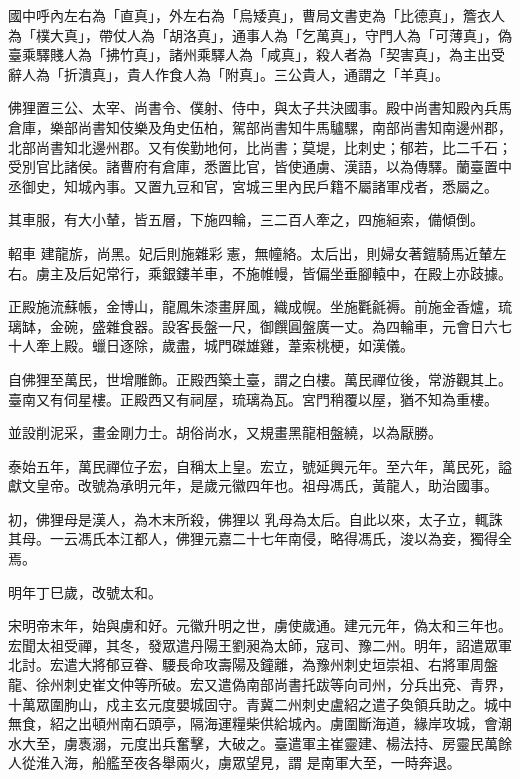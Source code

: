 \begin{pinyinscope}
 國中呼內左右為「直真」，外左右為「烏矮真」，曹局文書吏為「比德真」，簷衣人為「樸大真」，帶仗人為「胡洛真」，通事人為「乞萬真」，守門人為「可薄真」，偽臺乘驛賤人為「拂竹真」，諸州乘驛人為「咸真」，殺人者為「契害真」，為主出受辭人為「折潰真」，貴人作食人為「附真」。三公貴人，通謂之「羊真」。



 佛狸置三公、太宰、尚書令、僕射、侍中，與太子共決國事。殿中尚書知殿內兵馬倉庫，樂部尚書知伎樂及角史伍柏，駕部尚書知牛馬驢騾，南部尚書知南邊州郡，北部尚書知北邊州郡。又有俟勤地何，比尚書；莫堤，比刺史；郁若，比二千石；受別官比諸侯。諸曹府有倉庫，悉置比官，皆使通虜、漢語，以為傳驛。蘭臺置中丞御史，知城內事。又置九豆和官，宮城三里內民戶籍不屬諸軍戍者，悉屬之。



 其車服，有大小輦，皆五層，下施四輪，三二百人牽之，四施絙索，備傾倒。



 軺車
 建龍旂，尚黑。妃后則施雜彩憲，無幢絡。太后出，則婦女著鎧騎馬近輦左右。虜主及后妃常行，乘銀鏤羊車，不施帷幔，皆偏坐垂腳轅中，在殿上亦跂據。



 正殿施流蘇帳，金博山，龍鳳朱漆畫屏風，織成幌。坐施氍毹褥。前施金香爐，琉璃缽，金碗，盛雜食器。設客長盤一尺，御饌圓盤廣一丈。為四輪車，元會日六七十人牽上殿。蠟日逐除，歲盡，城門磔雄雞，葦索桃梗，如漢儀。



 自佛狸至萬民，世增雕飾。正殿西築土臺，謂之白樓。萬民禪位後，常游觀其上。臺南又有伺星樓。正殿西又有祠屋，琉璃為瓦。宮門稍覆以屋，猶不知為重樓。



 並設削泥采，畫金剛力士。胡俗尚水，又規畫黑龍相盤繞，以為厭勝。



 泰始五年，萬民禪位子宏，自稱太上皇。宏立，號延興元年。至六年，萬民死，謚獻文皇帝。改號為承明元年，是歲元徽四年也。祖母馮氏，黃龍人，助治國事。



 初，佛狸母是漢人，為木末所殺，佛狸以
 乳母為太后。自此以來，太子立，輒誅其母。一云馮氏本江都人，佛狸元嘉二十七年南侵，略得馮氏，浚以為妾，獨得全焉。



 明年丁巳歲，改號太和。



 宋明帝末年，始與虜和好。元徽升明之世，虜使歲通。建元元年，偽太和三年也。宏聞太祖受禪，其冬，發眾遣丹陽王劉昶為太師，寇司、豫二州。明年，詔遣眾軍北討。宏遣大將郁豆眷、騕長命攻壽陽及鐘離，為豫州刺史垣崇祖、右將軍周盤龍、徐州刺史崔文仲等所破。宏又遣偽南部尚書托跋等向司州，分兵出兗、青界，十萬眾圍朐山，戍主玄元度嬰城固守。青冀二州刺史盧紹之遣子奐領兵助之。城中無食，紹之出頓州南石頭亭，隔海運糧柴供給城內。虜圍斷海道，緣岸攻城，會潮水大至，虜褭溺，元度出兵奮擊，大破之。臺遣軍主崔靈建、楊法持、房靈民萬餘人從淮入海，船艦至夜各舉兩火，虜眾望見，謂
 是南軍大至，一時奔退。




\end{pinyinscope}
